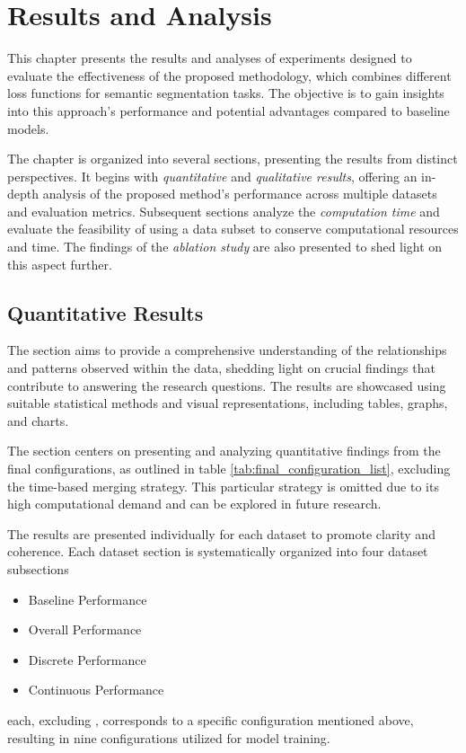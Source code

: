 \chapter{Results and Analysis}
\label{chap:results}
This chapter presents the results and analyses of experiments designed to evaluate the effectiveness of the proposed methodology, which combines different loss functions for semantic segmentation tasks. The objective is to gain insights into this approach's performance and potential advantages compared to baseline models.

The chapter is organized into several sections, presenting the results from distinct perspectives. It begins with \emph{quantitative} and \emph{qualitative results}, offering an in-depth analysis of the proposed method's performance across multiple datasets and evaluation metrics. Subsequent sections analyze the \emph{computation time} and evaluate the feasibility of using a data subset to conserve computational resources and time. The findings of the \emph{ablation study} are also presented to shed light on this aspect further.

\section{Quantitative Results}
\label{sec:quantitative_results}
The section aims to provide a comprehensive understanding of the relationships and patterns observed within the data, shedding light on crucial findings that contribute to answering the research questions. The results are showcased using suitable statistical methods and visual representations, including tables, graphs, and charts. 

The section centers on presenting and analyzing quantitative findings from the final configurations, as outlined in table \ref{tab:final_configuration_list}, excluding the time-based merging strategy. This particular strategy is omitted due to its high computational demand and can be explored in future research.

The results are presented individually for each dataset to promote clarity and coherence. Each dataset section is systematically organized into four dataset subsections
\begin{itemize}[noitemsep]
\item Baseline Performance
\item Overall Performance
\item Discrete Performance
\item Continuous Performance
\end{itemize}
each, excluding , corresponds to a specific configuration mentioned above, resulting in nine configurations utilized for model training.


